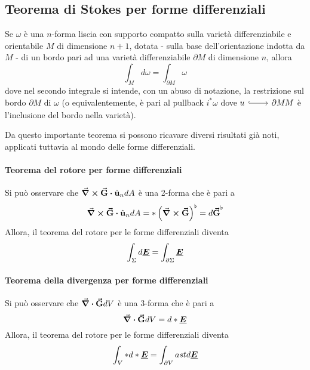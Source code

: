 \subsection{Teorema di Stokes per forme differenziali}
\begin{theoremaqed}
	Se $\omega$ è una $n$-forma liscia con supporto compatto sulla varietà differenziabile e orientabile $M$ di dimensione $n+1$, dotata - sulla base dell'orientazione indotta da $M$ - di un bordo pari ad una varietà differenziabile $\partial M$ di dimensione $n$, allora
	\begin{equation*}
		\int_{M}d\omega=\int_{\partial M}\omega
	\end{equation*}
dove nel secondo integrale si intende, con un abuso di notazione, la restrizione sul bordo $\partial M$ di $\omega$ (o equivalentemente, è pari al pullback $i^{\ast}\omega$ dove $\incl{u}{\partial M}{M}$ è l'inclusione del bordo nella varietà).
\end{theoremaqed}
Da questo importante teorema si possono ricavare diversi risultati già noti, applicati tuttavia al mondo delle forme differenziali.
\paragraph{Teorema del rotore per forme differenziali}
Si può osservare che $\curl{\vba{G}}\vdot \vbh{u}_n dA$ è una 2-forma che è pari a
\begin{equation*}
	\curl{\vba{G}}\vdot \vbh{u}_n dA=\ast\left(\curl{\vba{G}}\right)^\flat=d\vba{G}^\flat
\end{equation*}%
Allora, il teorema del rotore per le forme differenziali diventa
\begin{equation}
	\int_\Sigma d\vb*{\underline{E}}=\int_{\partial \Sigma}\vb*{\underline{E}}
\end{equation}
\paragraph{Teorema della divergenza per forme differenziali}
Si può osservare che $\div{\vb*{\va{G}}}dV$ è una 3-forma che è pari a
\begin{equation*}
	\div{\vb*{\va{G}}}dV=d\ast\vb*{\underline{E}}
\end{equation*}%
Allora, il teorema del rotore per le forme differenziali diventa
\begin{equation}
	\int_V \ast d\ast\vb*{\underline{E}}=\int_{\partial V}ast d\vb*{\underline{E}}
\end{equation}
